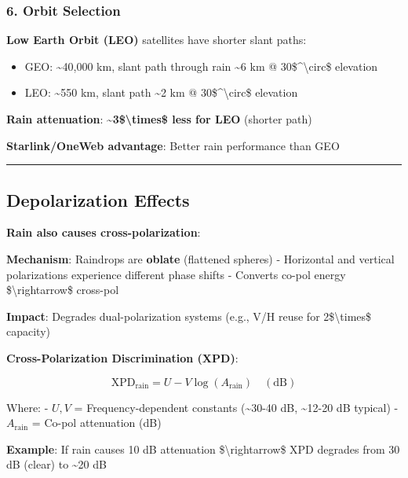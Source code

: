 \subsubsection{6. Orbit Selection}\label{orbit-selection}

\textbf{Low Earth Orbit (LEO)} satellites have shorter slant paths:

\begin{itemize}
\tightlist
\item
  GEO: \textasciitilde40,000 km, slant path through rain
  \textasciitilde6 km @ 30\$\^{}\textbackslash circ\$ elevation
\item
  LEO: \textasciitilde550 km, slant path \textasciitilde2 km @
  30\$\^{}\textbackslash circ\$ elevation
\end{itemize}

\textbf{Rain attenuation}:
\textbf{\textasciitilde3\$\textbackslash times\$ less for LEO} (shorter
path)

\textbf{Starlink/OneWeb advantage}: Better rain performance than GEO

\begin{center}\rule{0.5\linewidth}{0.5pt}\end{center}

\subsection{Depolarization Effects}\label{depolarization-effects}

\textbf{Rain also causes cross-polarization}:

\textbf{Mechanism}: Raindrops are \textbf{oblate} (flattened spheres) -
Horizontal and vertical polarizations experience different phase shifts
- Converts co-pol energy \$\textbackslash rightarrow\$ cross-pol

\textbf{Impact}: Degrades dual-polarization systems (e.g., V/H reuse for
2\$\textbackslash times\$ capacity)

\textbf{Cross-Polarization Discrimination (XPD)}:

\[
\text{XPD}_{\text{rain}} = U - V \log(A_{\text{rain}}) \quad (\text{dB})
\]

Where: - \(U, V\) = Frequency-dependent constants (\textasciitilde30-40
dB, \textasciitilde12-20 dB typical) - \(A_{\text{rain}}\) = Co-pol
attenuation (dB)

\textbf{Example}: If rain causes 10 dB attenuation
\$\textbackslash rightarrow\$ XPD degrades from 30 dB (clear) to
\textasciitilde20 dB


